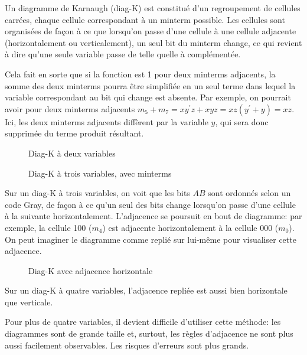 \documentclass[11pt]{article}
\begin{document}
Un diagramme de Karnaugh (diag-K) est constitué d'un regroupement de
cellules carrées, chaque cellule correspondant à un minterm
possible. Les cellules sont organisées de façon à ce que lorsqu'on
passe d'une cellule à une cellule adjacente (horizontalement ou
verticalement), un seul bit du minterm change, ce qui revient à dire
qu'une seule variable passe de telle quelle à complémentée.

Cela fait en sorte que si la fonction est 1 pour deux minterms
adjacents, la somme des deux minterms pourra être simplifiée en un
seul terme dans lequel la variable correspondant au bit qui change est
absente. Par exemple, on pourrait avoir pour deux minterms adjacents
\(m_5 + m_7 = xy^\prime z + xyz = xz(y^\prime + y) = xz\). Ici, les
deux minterms adjacents diffèrent par la variable \(y\), qui sera donc
supprimée du terme produit résultant.

\begin{figure}[htbp]
\centering

\caption{\label{fig:org7c62483}Diag-K à deux variables}
\end{figure}

\begin{figure}[htbp]
\centering

\caption{\label{fig:org2611efa}Diag-K à trois variables, avec minterms}
\end{figure}

Sur un diag-K à trois variables, on voit que les bits \(AB\) sont
ordonnés selon un code Gray, de façon à ce qu'un seul des bits change
lorsqu'on passe d'une cellule à la suivante
horizontalement. L'adjacence se poursuit en bout de diagramme: par
exemple, la cellule 100 (\(m_4\)) est adjacente horizontalement à la
cellule 000 (\(m_0\)). On peut imaginer le diagramme comme replié sur
lui-même pour visualiser cette adjacence.

\begin{figure}[htbp]
\centering

\caption{\label{fig:orgdcdb71b}Diag-K avec adjacence horizontale}
\end{figure}

Sur un diag-K à quatre variables, l'adjacence repliée est aussi bien horizontale
que verticale.

Pour plus de quatre variables, il devient difficile d'utiliser cette
méthode: les diagrammes sont de grande taille et, surtout, les règles
d'adjacence ne sont plus aussi facilement observables. Les risques
d'erreurs sont plus grands.
\end{document}
